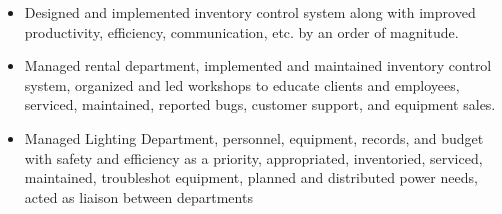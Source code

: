 \documentclass[letterpaper]{article}        %
\begin{document}
    \begin{itemize}
    \item Designed and implemented inventory control system along with improved productivity, efficiency, communication, etc. by an order of magnitude.
    \end{itemize}
  
    \begin{itemize}
    \item Managed rental department, implemented and maintained inventory control system, organized and led workshops to educate clients and employees, serviced, maintained, reported bugs, customer support, and equipment sales.
    \end{itemize}
  
    \begin{itemize}
    \item Managed Lighting Department, personnel, equipment, records, and budget with safety and efficiency as a priority, appropriated, inventoried, serviced, maintained, troubleshot equipment, planned and distributed power needs, acted as liaison between departments
    \end{itemize}

\end{document}

